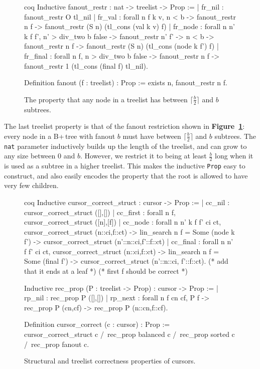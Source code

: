 \documentclass[12pt]{article}
\begin{document}
\begin{singlespace}
\begin{figure}[hpt]
\centering
\begin{cminted}{coq}
Inductive fanout_restr : nat -> treelist -> Prop :=
| fr_nil : fanout_restr O tl_nil
| fr_val : forall n f k v,
    n < b ->
    fanout_restr n f ->
    fanout_restr (S n) (tl_cons (val k v) f)
| fr_node : forall n n' k f f',
    n' > div_two b false ->
    fanout_restr n' f' ->
    n < b ->
    fanout_restr n f ->
    fanout_restr (S n) (tl_cons (node k f') f)
| fr_final : forall n f,
    n > div_two b false ->
    fanout_restr n f ->
    fanout_restr 1 (tl_cons (final f) tl_nil).

Definition fanout (f : treelist) : Prop :=
  exists n, fanout_restr n f.
\end{cminted}
\caption{The property that any node in a treelist has between $\lceil \frac{b}{2} \rceil$ and $b$ subtrees.}
\label{fig:fanout}
\end{figure}
\end{singlespace}

The last treelist property is that of the fanout restriction shown in \textbf{Figure~\ref{fig:fanout}}: every node in a B+\,tree with fanout $b$ must have between $\lceil \frac{b}{2} \rceil$ and $b$ subtrees. The \texttt{nat} parameter inductively builds up the length of the treelist, and can grow to any size between $0$ and $b$. However, we restrict it to being at least $\frac{b}{2}$ long when it is used as a subtree in a higher treelist. This makes the inductive \texttt{Prop} easy to construct, and also easily encodes the property that the root is allowed to have very few children.

\begin{singlespace}
\begin{figure}[hpt]
\centering
\begin{cminted}{coq}
Inductive cursor_correct_struct : cursor -> Prop :=
| cc_nil : cursor_correct_struct ([],[])
| cc_first : forall n f, cursor_correct_struct ([n],[f])
| cc_node : forall n n' k f f' ci ct,
    cursor_correct_struct (n::ci,f::ct) ->
    lin_search n f = Some (node k f') ->
    cursor_correct_struct (n'::n::ci,f'::f::ct)
| cc_final : forall n n' f f' ci ct,
    cursor_correct_struct (n::ci,f::ct) ->
    lin_search n f = Some (final f') ->
    cursor_correct_struct (n'::n::ci, f'::f::ct).
(* add that it ends at a leaf *)
(* first f should be correct *)

Inductive rec_prop (P : treelist -> Prop) : cursor -> Prop :=
| rp_nil : rec_prop P ([],[])
| rp_next : forall n f cn cf,
    P f -> rec_prop P (cn,cf) -> rec_prop P (n::cn,f::cf).

Definition cursor_correct (c : cursor) : Prop :=
  cursor_correct_struct c /\
  rec_prop balanced c /\
  rec_prop sorted c /\
  rec_prop fanout c.
\end{cminted}
\caption{Structural and treelist correctness properties of cursors.}
\label{fig:cursorcorrect}
\end{figure}
\end{singlespace}
\end{document}
